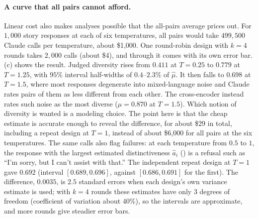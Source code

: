 \paragraph{A curve that all pairs cannot afford.} Linear cost also makes
analyses possible that the all-pairs average prices out. For $1{,}000$ story
responses at each of six temperatures, all pairs would take $499{,}500$
Claude calls per temperature, about \$1{,}000. One round-robin design with
$k=4$ rounds takes $2{,}000$ calls (about \$4), and through
 it comes with its own error bar. (c)
shows the result. Judged diversity rises from $0.411$ at $T=0.25$ to $0.779$
at $T=1.25$, with $95\%$ interval half-widths of $0.4$--$2.3\%$ of $\widehat\mu$. It then falls to
$0.698$ at $T=1.5$, where most responses degenerate into mixed-language
noise and Claude rates pairs of them as less different from each other. The
cross-encoder instead rates such noise as the most diverse ($\mu=0.870$ at
$T=1.5$). Which notion of
diversity is wanted is a modeling choice. The point here is that the cheap
estimate is accurate enough to reveal the difference, for about \$29
in total, including a repeat design at $T=1$, instead of about \$6{,}000 for
all pairs at the six temperatures. The same calls also flag failures: at each
temperature from $0.5$ to $1$, the response with the largest estimated
distinctiveness $\widehat a_i$ () is a refusal such
as ``I'm sorry, but I can't assist with that.'' The independent repeat design
at $T=1$ gave $0.692$ (interval $[0.689,0.696]$, against $[0.686,0.691]$ for
the first). The difference, $0.0035$, is $2.5$ standard errors when each
design's own variance estimate is used; with $k=4$ rounds these estimates
have only $3$ degrees of freedom (coefficient of variation about $40\%$), so
the intervals are approximate, and more rounds give steadier error bars.

